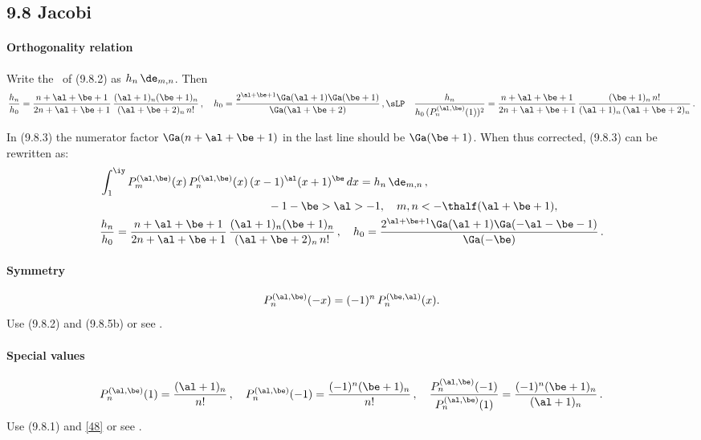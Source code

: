 \documentclass[envcountchap,graybox]{svmono}
\begin{document}
\subsection*{9.8 Jacobi}
\label{sec9.8}
%
\paragraph{Orthogonality relation}
Write the \RHS\ of (9.8.2) as $h_n\,\de_{m,n}$. Then
\begin{equation}
\begin{split}
&\frac{h_n}{h_0}=
\frac{n+\al+\be+1}{2n+\al+\be+1}\,
\frac{(\al+1)_n(\be+1)_n}{(\al+\be+2)_n\,n!}\,,\quad
h_0=\frac{2^{\al+\be+1}\Ga(\al+1)\Ga(\be+1)}{\Ga(\al+\be+2)}\,,\sLP
&\frac{h_n}{h_0\,(P_n^{(\al,\be)}(1))^2}=
\frac{n+\al+\be+1}{2n+\al+\be+1}\,
\frac{(\be+1)_n\,n!}{(\al+1)_n\,(\al+\be+2)_n}\,.
\end{split}
\label{60}
\end{equation}

In (9.8.3) the numerator factor $\Ga(n+\al+\be+1)$ in the last line should be
$\Ga(\be+1)$. When thus corrected, (9.8.3) can be rewritten as:
\begin{equation}
\begin{split}
&\int_1^\iy P_m^{(\al,\be)}(x)\,P_n^{(\al,\be)}(x)\,(x-1)^\al (x+1)^\be\,dx=h_n\,\de_{m,n}\,,\\
&\qquad\qquad\qquad\qquad\qquad\qquad\qquad\quad-1-\be>\al>-1,\quad m,n<-\thalf(\al+\be+1),\\
&\frac{h_n}{h_0}=
\frac{n+\al+\be+1}{2n+\al+\be+1}\,
\frac{(\al+1)_n(\be+1)_n}{(\al+\be+2)_n\,n!}\,,\quad
h_0=\frac{2^{\al+\be+1}\Ga(\al+1)\Ga(-\al-\be-1)}{\Ga(-\be)}\,.
\end{split}
\label{122}
\end{equation}

%
\paragraph{Symmetry}
\begin{equation}
P_n^{(\al,\be)}(-x)=(-1)^n\,P_n^{(\be,\al)}(x).
\label{48}
\end{equation}
Use (9.8.2) and (9.8.5b) or see .
%
\paragraph{Special values}
\begin{equation}
P_n^{(\al,\be)}(1)=\frac{(\al+1)_n}{n!}\,,\quad
P_n^{(\al,\be)}(-1)=\frac{(-1)^n(\be+1)_n}{n!}\,,\quad
\frac{P_n^{(\al,\be)}(-1)}{P_n^{(\al,\be)}(1)}=\frac{(-1)^n(\be+1)_n}{(\al+1)_n}\,.
\label{50}
\end{equation}
Use (9.8.1) and \eqref{48} or see .
%
\end{document}
